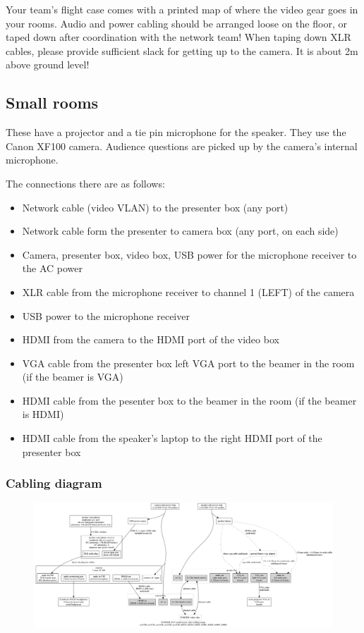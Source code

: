 \documentclass{article}
\begin{document}
Your team's flight case comes with a printed map of where the video gear goes in your rooms. Audio and power cabling should be arranged loose on the floor, or taped down after coordination with the network team! When taping down XLR cables, please provide sufficient slack for getting up to the camera. It is about 2m above ground level!

\subsection{Small rooms}
These have a projector and a tie pin microphone for the speaker. They use the Canon XF100 camera. Audience questions are picked up by the camera's internal microphone.

The connections there are as follows:

\begin{itemize}
  \item Network cable (video VLAN) to the presenter box (any port)
  \item Network cable form the presenter to camera box (any port, on each side)
  \item Camera, presenter box, video box, USB power for the microphone receiver to the AC power
  \item XLR cable from the microphone receiver to channel 1 (LEFT) of the camera
  \item USB power to the microphone receiver
  \item HDMI from the camera to the HDMI port of the video box
  \item VGA cable from the presenter box left VGA port to the beamer in the room (if the beamer is VGA)
  \item HDMI cable from the pesenter box to the beamer in the room (if the beamer is HDMI)
  \item HDMI cable from the speaker's laptop to the right HDMI port of the presenter box
\end{itemize}
\subsubsection{Cabling diagram}
\begin{figure}[H]
  \begin{sideways}
  \centering
  \includegraphics[width = 200mm]{../../graph/cabling_small_rooms.png}
  \end{sideways}
\end{figure}
\end{document}
